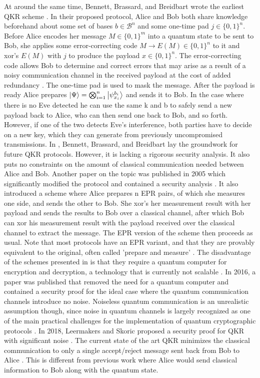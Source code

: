 \documentclass[%
 reprint,
nofootinbib,
 amsmath,amssymb,
 aps,
]{revtex4-2}
\begin{document}
At around the same time, Bennett, Brassard, and Breidbart wrote the earliest QKR scheme \cite{Bennett2014}. In their proposed protocol, Alice and Bob both share knowledge beforehand about some set of bases $b \in \mathcal{B}^n$  and some one-time pad $j \in \{0,1\}^n$. Before Alice encodes her message $M \in \{0,1\}^m$ into a quantum state to be sent to Bob, she applies some error-correcting code $M \rightarrow E(M) \in \{0,1\}^n$ to it and xor's $E(M)$ with $j$ to produce the payload $x \in \{0,1\}^n$. The error-correcting code allows Bob to determine and correct errors that may arise as a result of a noisy communication channel in the received payload at the cost of added redundancy \cite{Knill1997}. The one-time pad is used to mask the message. After the payload is ready Alice prepares $\ket{\Psi} = \bigotimes_{i=1}^n \ket{\psi_{x_i}^{b_i}}$ and sends it to Bob. In the case where there is no Eve detected he can use the same k and b to safely send a new payload back to Alice, who can then send one back to Bob, and so forth. However, if one of the two detects Eve's interference, both parties have to decide on a new key, which they can generate from previously uncompromised transmissions. In \cite{Bennett2014}, Bennett, Brassard, and Breidbart lay the groundwork for future QKR protocols. However, it is lacking a rigorous security analysis. It also puts no constraints on the amount of classical communication needed between Alice and Bob. Another paper on the topic was published in 2005 which significantly modified the protocol and contained a security analysis \cite{Damgard2006}. It also introduced a scheme where Alice prepares n EPR \cite{einstein1935can} pairs, of which she measures one side, and sends the other to Bob. She xor's her measurement result with her payload and sends the results to Bob over a classical channel, after which Bob can xor his measurement result with the payload received over the classical channel to extract the message. The EPR version of the scheme then proceeds as usual. Note that most protocols have an EPR variant, and that they are provably equivalent to the original, often called 'prepare and measure' \cite{Shor2000, PhysRevLett.68.557}. The disadvantage of the schemes presented in \cite{Damgard2006} is that they require a quantum computer for encryption and decryption, a technology that is currently not scalable \cite{preskill2018quantum}. In 2016, a paper was published \cite{Fehr2016} that removed the need for a quantum computer and contained a security proof for the ideal case where the quantum communication channels introduce no noise. Noiseless quantum communication is an unrealistic assumption though, since noise in quantum channels is largely recognized as one of the main practical challenges for the implementation of quantum cryptographic protocols \cite{Diamanti2016}. In 2018, Leermakers and Skoric proposed a security proof for QKR with significant noise \cite{QKRwithnoise}. The current state of the art QKR minimizes the classical communication to only a single accept/reject message sent back from Bob to Alice \cite{cryptoeprint:2019:875}. This is different from previous work where Alice would send classical information to Bob along with the quantum state.
\end{document}
